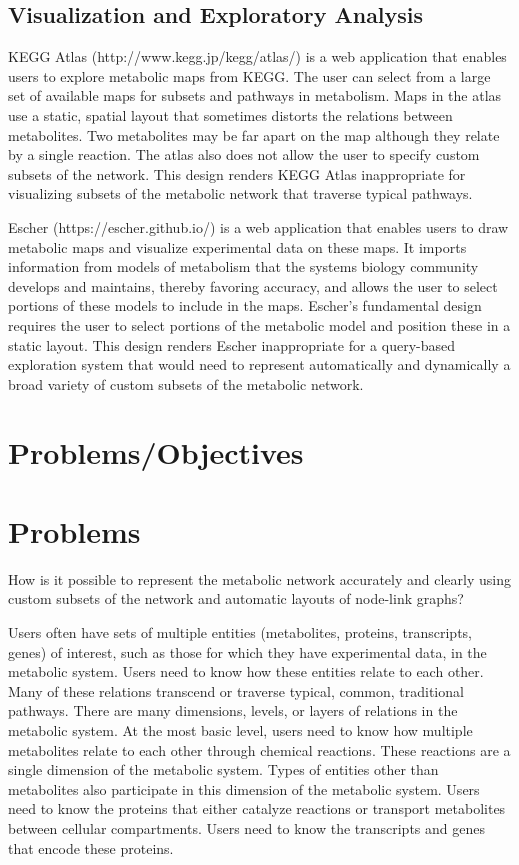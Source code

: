 \subsection{Visualization and Exploratory Analysis}

KEGG Atlas (http://www.kegg.jp/kegg/atlas/) \supercite{kanehisa_kegg_2016} is a web application that enables users to explore metabolic maps from KEGG.
The user can select from a large set of available maps for subsets and pathways in metabolism.
Maps in the atlas use a static, spatial layout that sometimes distorts the relations between metabolites.
Two metabolites may be far apart on the map although they relate by a single reaction.
The atlas also does not allow the user to specify custom subsets of the network.
This design renders KEGG Atlas inappropriate for visualizing subsets of the metabolic network that traverse typical pathways.

Escher (https://escher.github.io/) \supercite{king_escher:_2015} is a web application that enables users to draw metabolic maps and visualize experimental data on these maps.
It imports information from models of metabolism that the systems biology community develops and maintains, thereby favoring accuracy, and allows the user to select portions of these models to include in the maps.
Escher's fundamental design requires the user to select portions of the metabolic model and position these in a static layout.
This design renders Escher inappropriate for a query-based exploration system that would need to represent automatically and dynamically a broad variety of custom subsets of the metabolic network.

\section{Problems/Objectives}


\section{Problems}

How is it possible to represent the metabolic network accurately and clearly using custom subsets of the network and automatic layouts of node-link graphs?

Users often have sets of multiple entities (metabolites, proteins, transcripts, genes) of interest, such as those for which they have experimental data, in the metabolic system.
Users need to know how these entities relate to each other.
Many of these relations transcend or traverse typical, common, traditional pathways.
There are many dimensions, levels, or layers of relations in the metabolic system.
At the most basic level, users need to know how multiple metabolites relate to each other through chemical reactions.
These reactions are a single dimension of the metabolic system.
Types of entities other than metabolites also participate in this dimension of the metabolic system.
Users need to know the proteins that either catalyze reactions or transport metabolites between cellular compartments.
Users need to know the transcripts and genes that encode these proteins.

